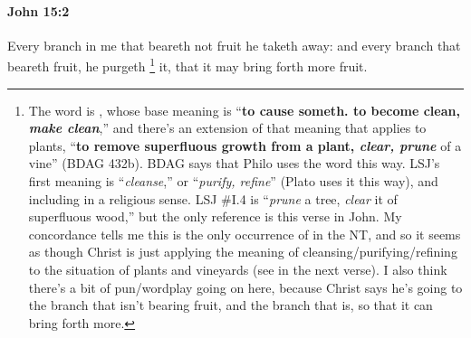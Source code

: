 			\begin{framed}
				\scriptsize
				\begin{compactdesc}
					\item[SBLG] 
				\end{compactdesc}
			\end{framed}

		\paragraph{John 15:2} %
			\label{JOHN-15-2}

			Every branch in me that beareth not fruit he taketh away: and every branch that beareth fruit, he purgeth%
				\footnote{%
					The word is , whose base meaning is ``\textbf{to cause someth. to become clean, \textit{make clean}},'' and there's an extension of that meaning that applies to plants, ``\textbf{to remove superfluous growth from a plant, \textit{clear, prune}} of a vine'' (BDAG 432b). BDAG says that Philo uses the word this way. LSJ's first meaning is ``\textit{cleanse},'' or ``\textit{purify, refine}'' (Plato uses it this way), and including in a religious sense. LSJ \#I.4 is ``\textit{prune} a tree, \textit{clear} it of superfluous wood,'' but the only reference is this verse in John. My concordance tells me this is the only occurrence of  in the NT, and so it seems as though Christ is just applying the meaning of cleansing/purifying/refining to the situation of plants and vineyards (see  in the next verse). I also think there's a bit of pun/wordplay going on here, because Christ says he's going to  the branch that isn't bearing fruit, and  the branch that is, so that it can bring forth more.
					}
			it, that it may bring forth more fruit.

